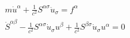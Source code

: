 \begin{equation}
     \begin{array}{ll}
     m\dot{u}^\alpha+\displaystyle\frac{1}{c^2}S^{\alpha\sigma}
     \ddot{u}_{\sigma}=f^\alpha
     \\[8pt]
     \dot{S}^{\alpha\beta}-
     \displaystyle\frac{1}{c^2}S^{\alpha\sigma}
     \dot{u}_{\sigma}u^\beta
     +
     \displaystyle\frac{1}{c^2}S^{\beta\sigma}\dot{u}_{\sigma}u^\alpha
     =0
     \end{array}
     \label{RMeq}
\end{equation}

